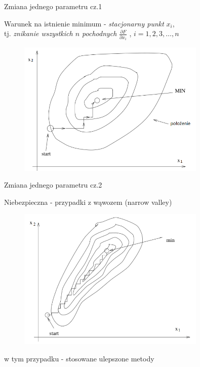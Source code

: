   \begin{frame}{Zmiana jednego parametru cz.1}

	Warunek na istnienie minimum - \emph{stacjonarny punkt} $ x_i $,
	\\tj. \emph{znikanie wszystkich $ n $ pochodnych} $ \frac{\partial F}{\partial x_i} $ , $ i = 1,2,3,\ldots ,n $
	\begin{figure}
		\centering
		\includegraphics[height=0.6\textheight ,width=0.8\textwidth]{img/17/change_param_1}
	\end{figure}

  \end{frame}

  \begin{frame}{Zmiana jednego parametru cz.2}

	Niebezpieczna - przypadki z wąwozem (narrow valley)
	\begin{figure}
		\centering
		\includegraphics[height=0.6\textheight ,width=0.8\textwidth]{img/17/change_param_2}
	\end{figure}
	w tym przypadku - stosowane ulepszone metody

  \end{frame}

